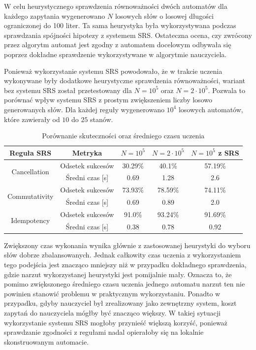 W celu heurystycznego sprawdzenia równoważności dwóch automatów dla każdego zapytania wygenerowano
$N$ losowych słów o losowej długości ograniczonej do 100 liter. Ta sama heurystyka była wykorzystywana podczas
sprawdzania spójności hipotezy z systemem SRS. Ostateczna ocena, czy zwrócony przez algorytm automat jest
zgodny z automatem docelowym odbywała się poprzez dokładne sprawdzenie wykorzystywane w algorytmie nauczyciela.

Ponieważ wykorzystanie systemu SRS powodowało, że w trakcie uczenia wykonywane były dodatkowe heurystyczne
sprawdzenia równoważności, wariant bez systemu SRS został przetestowany dla $N = 10^5$ oraz $N = 2 \cdot 10^5$.
Pozwala to porównać wpływ systemu SRS z prostym zwiększeniem liczby losowo generowanych słów.
Dla każdej reguły wygenerowano $10^4$ losowych automatów, które zawierały od $10$ do $25$ stanów.

\begin{table}[H]
\centering
\begin{tabular}{cc|ccc}
\hline
Reguła SRS & Metryka
& $N = 10^5$
& $N = 2\cdot10^5$
& $N = 10^5$ z SRS \\
\hline
\multirow{2}{*}{Cancellation}
& Odsetek sukcesów & 30.29\% & 40.1\% & 57.19\% \\
& Średni czas [s] & 0.69 & 1.28 & 2.6 \\
\hline
\multirow{2}{*}{Commutativity}
& Odsetek sukcesów & 73.93\% & 78.59\% & 74.11\% \\
& Średni czas [s] & 0.69 & 0.89 & 2.0 \\
\hline
\multirow{2}{*}{Idempotency}
& Odsetek sukcesów & 91.0\% & 93.24\% & 91.69\% \\
& Średni czas [s] & 0.38 & 0.78 & 0.92 \\
\hline
\end{tabular}
\caption{Porównanie skuteczności oraz średniego czasu uczenia}
\end{table}

Zwiększony czas wykonania wynika głównie z zastosowanej heurystyki do wyboru słów dobrze zbalansowanych.
Jednak całkowity czas uczenia z wykorzystaniem tego podejścia jest znacząco mniejszy niż w przypadku
dokładnego sprawdzenia, gdzie narzut wykorzystanej heurystyki jest pomijalnie mały. Oznacza to, że pomimo zwiększonego
średniego czasu uczenia jednego automatu narzut ten nie powinien stanowić problemu w praktycznym wykorzystaniu.
Ponadto w przypadku, gdyby nauczyciel był zrealizowany jako zewnętrzny system,
koszt zapytań do nauczyciela mógłby być znacząco większy. W takiej sytuacji
wykorzystanie systemu SRS mogłoby przynieść większą korzyść, ponieważ sprawdzanie
zgodności z regułami nadal opierałoby się na lokalnie skonstruowanym automacie.

